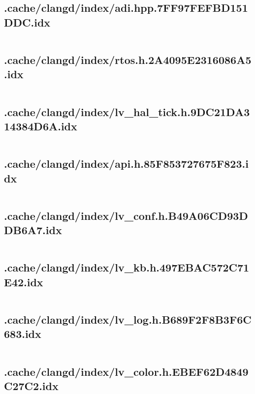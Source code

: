 \subsection{.cache/clangd/index/adi.hpp.7FF97FEFBD151DDC.idx}
\inputminted[linenos,tabsize=2,breaklines, breakanywhere]{c}{adi.hpp.7FF97FEFBD151DDC.idx}
\pagebreak

\subsection{.cache/clangd/index/rtos.h.2A4095E2316086A5.idx}
\inputminted[linenos,tabsize=2,breaklines, breakanywhere]{c}{rtos.h.2A4095E2316086A5.idx}
\pagebreak

\subsection{.cache/clangd/index/lv_hal_tick.h.9DC21DA314384D6A.idx}
\inputminted[linenos,tabsize=2,breaklines, breakanywhere]{c}{lv_hal_tick.h.9DC21DA314384D6A.idx}
\pagebreak

\subsection{.cache/clangd/index/api.h.85F853727675F823.idx}
\inputminted[linenos,tabsize=2,breaklines, breakanywhere]{c}{api.h.85F853727675F823.idx}
\pagebreak

\subsection{.cache/clangd/index/lv_conf.h.B49A06CD93DDB6A7.idx}
\inputminted[linenos,tabsize=2,breaklines, breakanywhere]{c}{lv_conf.h.B49A06CD93DDB6A7.idx}
\pagebreak

\subsection{.cache/clangd/index/lv_kb.h.497EBAC572C71E42.idx}
\inputminted[linenos,tabsize=2,breaklines, breakanywhere]{c}{lv_kb.h.497EBAC572C71E42.idx}
\pagebreak

\subsection{.cache/clangd/index/lv_log.h.B689F2F8B3F6C683.idx}
\inputminted[linenos,tabsize=2,breaklines, breakanywhere]{c}{lv_log.h.B689F2F8B3F6C683.idx}
\pagebreak

\subsection{.cache/clangd/index/lv_color.h.EBEF62D4849C27C2.idx}
\inputminted[linenos,tabsize=2,breaklines, breakanywhere]{c}{lv_color.h.EBEF62D4849C27C2.idx}
\pagebreak


